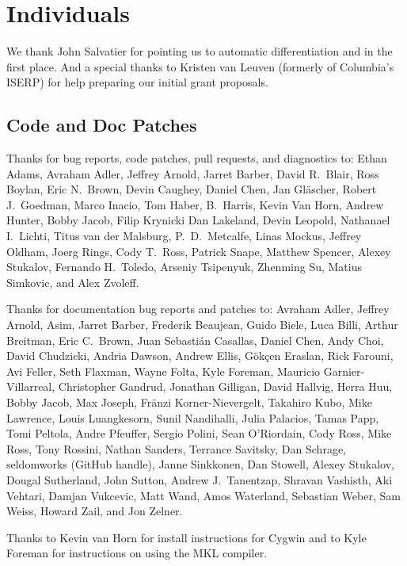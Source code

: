 \section*{Individuals}

We thank John Salvatier for pointing us to automatic differentiation
and \HMC in the first place.  And a special thanks to Kristen van
Leuven (formerly of Columbia's ISERP) for help preparing our initial
grant proposals.

\subsection*{Code  and Doc Patches}

Thanks for bug reports, code patches, pull requests, and diagnostics
to: 
Ethan Adams, 
Avraham Adler,
Jeffrey Arnold, 
Jarret Barber, 
David R.~Blair, 
Ross Boylan, 
Eric N.~Brown, 
Devin Caughey, 
Daniel Chen,
Jan Gl\"ascher,
Robert J.\ Goedman, 
Marco Inacio, 
Tom Haber,
B.~Harris, 
Kevin Van Horn, 
Andrew Hunter,
Bobby Jacob, 
Filip Krynicki
Dan Lakeland, 
Devin Leopold, 
Nathanael I.~Lichti,
Titus van der Malsburg,
P.~D.~Metcalfe, 
Linas Mockus,
Jeffrey Oldham, 
Joerg Rings,
Cody T.\ Ross,
Patrick Snape,
Matthew Spencer,
Alexey Stukalov,
Fernando H.~Toledo, 
Arseniy Tsipenyuk,
Zhenming Su,
Matius Simkovic, and
Alex Zvoleff.

Thanks for documentation bug reports and patches to: 
Avraham Adler,
Jeffrey Arnold,
Asim, 
Jarret Barber, 
Frederik Beaujean,
Guido Biele,
Luca Billi, 
Arthur Breitman,
Eric C.~Brown, 
Juan Sebasti\'an Casallas,
Daniel Chen,
Andy Choi, 
David Chudzicki,
Andria Dawson, 
Andrew Ellis,
G\"{o}k\c{c}en Eraslan,
Rick Farouni,
Avi Feller,
Seth Flaxman, 
Wayne Folta, 
Kyle Foreman,
Mauricio Garnier-Villarreal,
Christopher Gandrud,
Jonathan Gilligan,
David Hallvig,
Herra Huu,
Bobby Jacob,
Max Joseph,
Fr\"anzi Korner-Nievergelt,
Takahiro Kubo,
Mike Lawrence,
Louis Luangkesorn, 
Sunil Nandihalli,
Julia Palacios,
Tamas Papp, 
Tomi Peltola,
Andre Pfeuffer,
Sergio Polini,
Sean O'Riordain, 
Cody Ross, 
Mike Ross, 
Tony Rossini,
Nathan Sanders, 
Terrance Savitsky,
Dan Schrage,
seldomworks (GitHub handle),
Janne Sinkkonen, 
Dan Stowell, 
Alexey Stukalov,
Dougal Sutherland, 
John Sutton,
Andrew J.~Tanentzap,
Shravan Vashisth, 
Aki Vehtari,
Damjan Vukcevic,
Matt Wand,
Amos Waterland,
Sebastian Weber, 
Sam Weiss,
Howard Zail, and
Jon Zelner.

Thanks to Kevin van Horn for install instructions for Cygwin and to
Kyle Foreman for instructions on using the MKL compiler.


